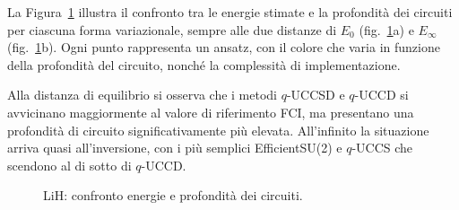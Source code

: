 La Figura~\ref{fig:energie-profondità-colorbar} illustra il confronto tra le energie stimate e la profondità dei circuiti per ciascuna forma variazionale, sempre alle due distanze di $E_0$ (fig.~\ref{fig:energie-profondità-colorbar}a) e $E_\infty$ (fig.~\ref{fig:energie-profondità-colorbar}b). Ogni punto rappresenta un ansatz, con il colore che varia in funzione della profondità del circuito, nonché la complessità di implementazione.

Alla distanza di equilibrio si osserva che i metodi $q$-UCCSD e $q$-UCCD si avvicinano maggiormente al valore di riferimento FCI, ma presentano una profondità di circuito significativamente più elevata. All'infinito la situazione arriva quasi all'inversione, con i più semplici EfficientSU(2) e $q$-UCCS che scendono al di sotto di $q$-UCCD. 

\begin{center}
    \begin{figure}[H]%
        \hfill
        \caption{LiH: confronto energie e profondità dei circuiti.}%
        \label{fig:energie-profondità-colorbar}%
    \end{figure}
\end{center}


